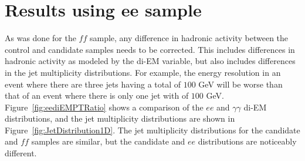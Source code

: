 \section{Results using ee sample}
\label{sec:eeResults}
As was done for the $ff$ sample,
any difference in hadronic activity between the control and candidate
samples needs to be corrected.
This includes differences in hadronic
activity as modeled by the di-EM \pt variable, but also includes
differences in the jet multiplicity distributions.
For example, the energy resolution in an event where
there are three jets having a total \pt of $100$ GeV will be worse than that
of an event where there is only one jet with \pt of $100$ GeV.
Figure~\ref{fig:eediEMPTRatio} shows a
comparison of the $ee$ and $\gamma\gamma$ di-EM \pt distributions, and
the jet multiplicity distributions are shown in Figure~\ref{fig:JetDistribution1D}.
The jet multiplicity distributions for the candidate and $ff$ samples are
similar, but the candidate and $ee$ distributions are noticeably different.
%
%
